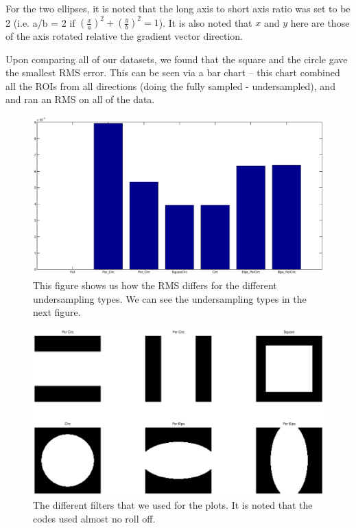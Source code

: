 \documentclass[11 pt]{article}
\begin{document}
    For the two ellipses, it is noted that the long axis to short axis ratio was set to be 2 (i.e. a/b = 2 if $\left(\frac{x}{a}\right)^2 + \left(\frac{y}{b}\right)^2 = 1$). It is also noted that $x$ and $y$ here are those of the axis rotated relative the gradient vector direction.
    
    Upon comparing all of our datasets, we found that the square and the circle gave the smallest RMS error. This can be seen via a bar chart -- this chart combined all the ROIs from all directions (doing the fully sampled - undersampled), and and ran an RMS on all of the data.
    
    \begin{figure}
      \centering
      \vspace{0pt}
      \setlength\fboxsep{0pt}
      \setlength\fboxrule{0.5pt}
      \includegraphics[trim = {10mm 0mm 10mm 0mm},clip,scale = 0.4] {Figs/numericalSims/nSimRMS.eps}
      \caption{This figure shows us how the RMS differs for the different undersampling types. We can see the undersampling types in the next figure.}
      \label{fig:RMSPhant}

  \end{figure}
  
  \begin{figure}
      \centering
      \vspace{0pt}
      \setlength\fboxsep{0pt}
      \setlength\fboxrule{0.5pt}
      \includegraphics[trim = {10mm 0mm 10mm 0mm},clip,scale = 0.4] {Figs/numericalSims/DiffFilts.eps}
      \caption{The different filters that we used for the plots. It is noted that the codes used almost no roll off.}
      \label{fig:RMSPhant}

  \end{figure}
  
\end{document}
